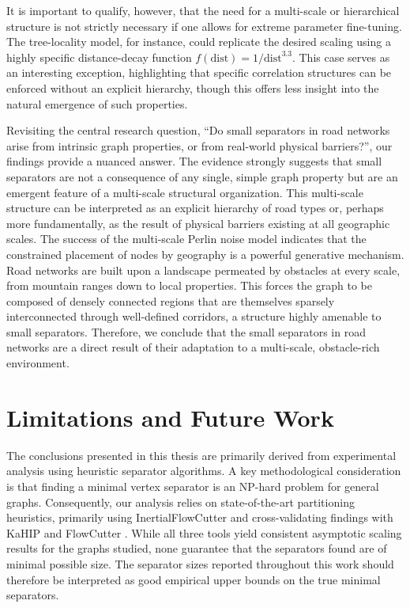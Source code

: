 It is important to qualify, however, that the need for a multi-scale or hierarchical structure is not strictly necessary if one allows for extreme parameter fine-tuning.
The tree-locality model, for instance, could replicate the desired scaling using a highly specific distance-decay function \(f(\text{dist}) = 1/\text{dist}^{3.3}\).
This case serves as an interesting exception, highlighting that specific correlation structures can be enforced without an explicit hierarchy, though this offers less insight into the natural emergence of such properties.

Revisiting the central research question, \enquote{Do small separators in road networks arise from intrinsic graph properties, or from real-world physical barriers?}, our findings provide a nuanced answer.
The evidence strongly suggests that small separators are not a consequence of any single, simple graph property but are an emergent feature of a multi-scale structural organization.
This multi-scale structure can be interpreted as an explicit hierarchy of road types or, perhaps more fundamentally, as the result of physical barriers existing at all geographic scales.
The success of the multi-scale Perlin noise model indicates that the constrained placement of nodes by geography is a powerful generative mechanism.
Road networks are built upon a landscape permeated by obstacles at every scale, from mountain ranges down to local properties.
This forces the graph to be composed of densely connected regions that are themselves sparsely interconnected through well-defined corridors, a structure highly amenable to small separators.
Therefore, we conclude that the small separators in road networks are a direct result of their adaptation to a multi-scale, obstacle-rich environment.

\section{Limitations and Future Work}
\label{sec:conclusion:future_work}

The conclusions presented in this thesis are primarily derived from experimental analysis using heuristic separator algorithms.
A key methodological consideration is that finding a minimal vertex separator is an NP-hard problem for general graphs.
Consequently, our analysis relies on state-of-the-art partitioning heuristics, primarily using InertialFlowCutter \cite{gottesburen_faster_2019} and cross-validating findings with KaHIP \cite{sanders_think_2013} and FlowCutter \cite{hamann_graph_2018}.
While all three tools yield consistent asymptotic scaling results for the graphs studied, none guarantee that the separators found are of minimal possible size.
The separator sizes reported throughout this work should therefore be interpreted as good empirical upper bounds on the true minimal separators.

